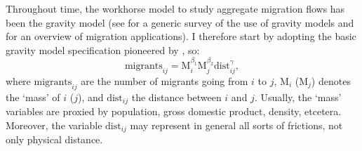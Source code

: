 \documentclass[fleqn,10pt]{SelfArx} %
\begin{document}
        Throughout time, the workhorse model to study aggregate migration flows has been the gravity model (see \citet{anderson2011gravity} for a generic survey of the use of gravity models and \citet{poot2016gravity} for an overview of migration applications). I therefore start by adopting the basic gravity model specification pioneered by
        \citet{tinbergen1962shaping}, so:
        \begin{equation}
          \text{migrants}_{ij} = \text{M}_i^{\beta_1}\text{M}_j^{\beta_2}\text{dist}_{ij}^\gamma,
          \label{eq:grav}
        \end{equation}
        where $\text{migrants}_{ij}$ are the number of migrants going from $i$ to $j$, 
        $\text{M}_i$ ($\text{M}_j$) denotes the `mass' of $i$ ($j$), and $\text{dist}_{ij}$
        the distance between $i$ and $j$. Usually, the `mass' variables are proxied by population, gross domestic product, density, etcetera. Moreover, the variable
        $\text{dist}_{ij}$ may represent in general all sorts of frictions, not
        only physical distance.
        
\end{document}
